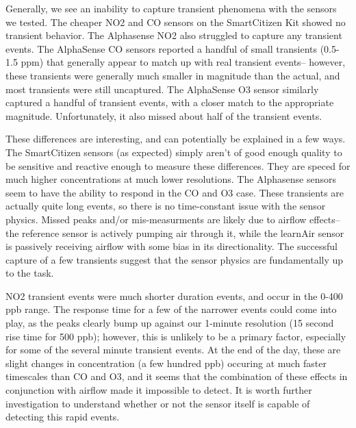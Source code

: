 Generally, we see an inability to capture transient phenomena with the sensors we tested.  The cheaper NO2 and CO sensors on the SmartCitizen Kit showed no transient behavior.  The Alphasense NO2 also struggled to capture any transient events. The AlphaSense CO sensors reported a handful of small transients (0.5-1.5 ppm) that generally appear to match up with real transient events-- however, these transients were generally much smaller in magnitude than the actual, and most transients were still uncaptured.  The AlphaSense O3 sensor similarly captured a handful of transient events, with a closer match to the appropriate magnitude.  Unfortunately, it also missed about half of the transient events.

 These differences are interesting, and can potentially be explained in a few ways.  The SmartCitizen sensors (as expected) simply aren't of good enough quality to be sensitive and reactive enough to measure these differences.  They are speced for much higher concentrations at much lower resolutions.  The Alphasense sensors seem to have the ability to respond in the CO and O3 case.  These transients are actually quite long events, so there is no time-constant issue with the sensor physics.  Missed peaks and/or mis-measurments are likely due to airflow effects-- the reference sensor is actively pumping air through it, while the learnAir sensor is passively receiving airflow with some bias in its directionality.  The successful capture of a few transients suggest that the sensor physics are fundamentally up to the task.
 
NO2 transient events were much shorter duration events, and occur in the 0-400 ppb range.  The response time for a few of the narrower events could come into play, as the peaks clearly bump up against our 1-minute resolution (15 second rise time for 500 ppb); however, this is unlikely to be a primary factor, especially for some of the several minute transient events.  At the end of the day, these are slight changes in concentration (a few hundred ppb) occuring at much faster timescales than CO and O3, and it seems that the combination of these effects in conjunction with airflow made it impossible to detect.  It is worth further investigation to understand whether or not the sensor itself is capable of detecting this rapid events.
 





